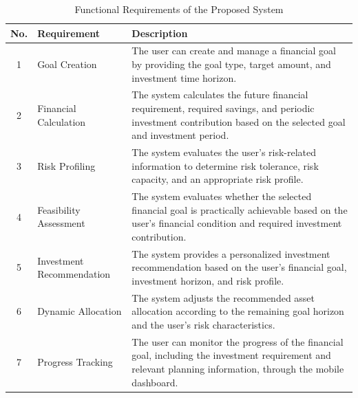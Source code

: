 \begin{table}[h!]
    \centering
    \caption{Functional Requirements of the Proposed System}
    \label{tab:funcreq}
    \vspace*{5pt}

    {\singlespacing\small
    \begin{tabular}{|c|p{4cm}|p{6.5cm}|}
        \hline
        \textbf{No.} & \textbf{Requirement} & \textbf{Description} \\
        \hline

        1 & Goal Creation &
        The user can create and manage a financial goal by providing
        the goal type, target amount, and investment time horizon. \\
        \hline

        2 & Financial Calculation &
        The system calculates the future financial requirement,
        required savings, and periodic investment contribution based
        on the selected goal and investment period. \\
        \hline

        3 & Risk Profiling &
        The system evaluates the user's risk-related information to
        determine risk tolerance, risk capacity, and an appropriate
        risk profile. \\
        \hline

        4 & Feasibility Assessment &
        The system evaluates whether the selected financial goal is
        practically achievable based on the user's financial
        condition and required investment contribution. \\
        \hline

        5 & Investment Recommendation &
        The system provides a personalized investment recommendation
        based on the user's financial goal, investment horizon, and
        risk profile. \\
        \hline

        6 & Dynamic Allocation &
        The system adjusts the recommended asset allocation according
        to the remaining goal horizon and the user's risk
        characteristics. \\
        \hline

        7 & Progress Tracking &
        The user can monitor the progress of the financial goal,
        including the investment requirement and relevant planning
        information, through the mobile dashboard. \\
        \hline

    \end{tabular}}
\end{table}

